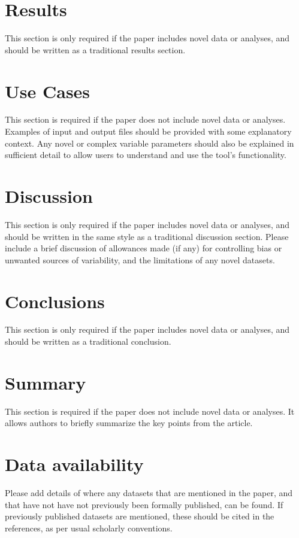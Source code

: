 \documentclass[10pt,a4paper,twocolumn]{article}
\begin{document}
\section*{Results} %
This section is only required if the paper includes novel data or analyses, and should be written as a traditional results section.

\section*{Use Cases} %
This section is required if the paper does not include novel data or analyses. 
Examples of input and output files should be provided with some explanatory context.  Any novel or complex variable parameters should also be explained in sufficient detail to allow users to understand and use the tool's functionality.

\section*{Discussion} %
This section is only required if the paper includes novel data or analyses, and should be written in the same style as a traditional discussion section.
Please include a brief discussion of allowances made (if any) for controlling bias or unwanted sources of variability, and the limitations of any novel datasets.


\section*{Conclusions} %
This section is only required if the paper includes novel data or analyses, and should be written as a traditional conclusion.

\section*{Summary} %
This section is required if the paper does not include novel data or analyses.  It allows authors to briefly summarize the key points from the article.

\section*{Data availability} %
Please add details of where any datasets that are mentioned in the paper, and that have not have not previously been formally published, can be found.  If previously published datasets are mentioned, these should be cited in the references, as per usual scholarly conventions.
\end{document}

